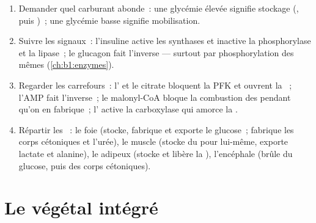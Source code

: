 \begin{method}\label{met:b1:biosyntheses-integration:state}
\begin{enumerate}
  \item Demander quel carburant abonde~: une glycémie élevée signifie
        stockage (, puis )~; une glycémie basse signifie
        mobilisation.
  \item Suivre les signaux~: l'insuline active les synthases et inactive
        la phosphorylase et la lipase~; le glucagon fait l'inverse ---
        surtout par phosphorylation des mêmes 
        (\cref{ch:b1:enzymes}).
  \item Regarder les carrefours~: l' et le citrate bloquent la PFK et
        ouvrent la ~; l'AMP fait l'inverse~; le
        malonyl-CoA bloque la combustion des  pendant qu'on en
        fabrique~; l' active la carboxylase qui amorce la
        .
  \item Répartir les ~: le foie (stocke, fabrique et exporte le
        glucose~; fabrique les corps cétoniques et l'urée), le muscle
        (stocke du  pour lui-même, exporte lactate et alanine),
        le  adipeux (stocke et libère la ), l'encéphale
        (brûle du glucose, puis des corps cétoniques).
\end{enumerate}
\end{method}

\section{Le végétal intégré}

